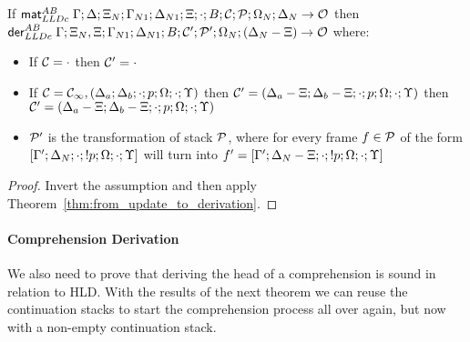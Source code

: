 \begin{corollary}\label{thm:match_to_derivation}
If $\mathsf{mat}_{LLDc}^{AB} \; \Gamma; \Delta; \Xi_N; \Gamma_{N1}; \Delta_{N1}; \Xi; \cdot; B;
\mathcal{C}; \mathcal{P};
\Omega_N; \Delta_N \rightarrow \mathcal{O}$ then\\
\texttab$\mathsf{der}_{LLDc}^{AB} \; \Gamma; \Xi_N, \Xi; \Gamma_{N1}; \Delta_{N1}; B; \mathcal{C'};
\mathcal{P'}; \Omega_N; (\Delta_N - \Xi) \rightarrow \mathcal{O}$ where:
   
\begin{itemize}[leftmargin=*]
   \item If $\mathcal{C} = \cdot$ then $\mathcal{C'} = \cdot$
   \item If $\mathcal{C} = \mathcal{C_1}, (\Delta_a; \Delta_b; \cdot; p; \Omega;
         \cdot; \Upsilon)$ then $\mathcal{C'} = (\Delta_a - \Xi; \Delta_b - \Xi; \cdot; p;
            \Omega; \cdot; \Upsilon)$ then \linebreak $\mathcal{C'} = (\Delta_a - \Xi; \Delta_b - \Xi; \cdot; p; \Omega; \cdot; \Upsilon)$
   \item $\mathcal{P'}$ is the transformation of stack $\mathcal{P}$, where for every frame $f \in
   \mathcal{P}$ of the form $[\Gamma'; \Delta_N; \cdot; {!} p; \Omega; \cdot; \Upsilon]$
   will turn into $f' = [\Gamma';\Delta_N-\Xi;\cdot;{!} p;\Omega;\cdot;\Upsilon]$
\end{itemize}
\end{corollary}

\begin{proof}
Invert the assumption and then apply Theorem~\ref{thm:from_update_to_derivation}.
\end{proof}


\paragraph{Comprehension Derivation}

We also need to prove that deriving the head of a comprehension is sound in
relation to HLD.  With the results of the next theorem we can reuse the
continuation stacks to start the comprehension process all over again, but now
with a non-empty continuation stack.

